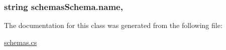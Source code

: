 \subsubsection[{\texorpdfstring{name}{name}}]{\setlength{\rightskip}{0pt plus 5cm}string schemas\+Schema.\+name\hspace{0.3cm}{\ttfamily [get]}, {\ttfamily [set]}}\hypertarget{classschemas_schema_ade6edd95fc90d8c67e0c0bfe34388a79}{}\label{classschemas_schema_ade6edd95fc90d8c67e0c0bfe34388a79}






The documentation for this class was generated from the following file\+:\begin{DoxyCompactItemize}
\item 
\hyperlink{schemas_8cs}{schemas.\+cs}\end{DoxyCompactItemize}
